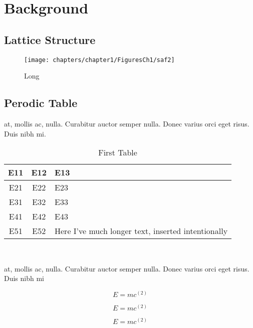 \chapter{Background}
\lipsum[1]

\section{Lattice Structure}
\lipsum[1]
\begin{figure}[h]
	\centering
	\texttt{[image: chapters/chapter1/FiguresCh1/saf2]}
	\caption[fig1short]{Long}
	\label{fig:saf2}
\end{figure}

\section{Perodic Table}
at, mollis ac, nulla. Curabitur auctor semper nulla. Donec varius orci eget risus. Duis nibh mi.
\begin{table}[h]
	\caption{First Table}
	\centering
	\begin{tabular}{| c | c | p{4cm} | }
		E11 & E12 & E13 \\ \hline  %
		E21 & E22 & E23 \\
		E31 & E32 & E33 \\
		E41 & E42 & E43 \\
		E51 & E52 & Here I've much longer text, inserted intentionally
	\end{tabular} \\
\end{table}
at, mollis ac, nulla. Curabitur auctor semper nulla. Donec varius orci eget risus. Duis nibh mi

\begin{equation}\label{eq:super1}
E = mc^{(2)}
\end{equation}

\begin{equation}\label{eq:super2}
E = mc^{(2)}
\end{equation}

\begin{equation}\label{eq:super3}
E = mc^{(2)}
\end{equation}

\lipsum[1-20]

